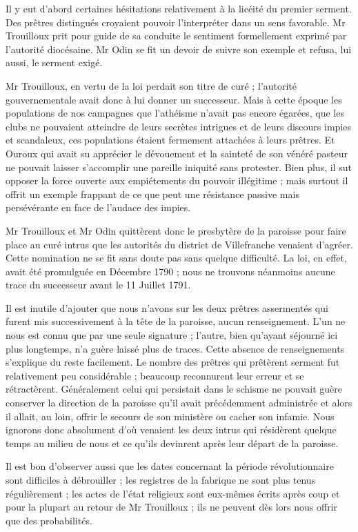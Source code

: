 Il y eut d'abord certaines hésitations relativement à la licéité du premier serment. Des prêtres distingués croyaient pouvoir l'interpréter dans un sens favorable. Mr Trouilloux prit pour guide de sa conduite le sentiment formellement exprimé par l'autorité diocésaine. Mr Odin se fit un devoir de suivre son exemple et refusa, lui aussi, le serment exigé.

Mr Trouilloux, en vertu de la loi perdait son titre de curé ; l'autorité gouvernementale avait donc à lui donner un successeur. Mais à cette époque les populations de nos campagnes que l'athéisme n'avait pas encore égarées, que les clubs ne pouvaient atteindre de leurs secrètes intrigues et de leurs discours impies et scandaleux, ces populations étaient fermement attachées à leurs prêtres. Et Ouroux qui avait su apprécier le dévouement et la sainteté de son vénéré pasteur ne pouvait laisser s'accomplir une pareille iniquité sans protester. Bien plus, il sut opposer la force ouverte aux empiétements du pouvoir illégitime ; mais surtout il offrit un exemple frappant de ce que peut une résistance passive mais persévérante en face de l'audace des impies.

Mr Trouilloux et Mr Odin quittèrent donc le presbytère de la paroisse pour faire place au curé intrus que les autorités du district de Villefranche venaient d'agréer. Cette nomination ne se fit sans doute pas sans quelque difficulté. La loi, en effet, avait été promulguée en Décembre 1790 ; nous ne trouvons néanmoins aucune trace du successeur avant le 11 Juillet 1791.

Il est inutile d'ajouter que nous n'avons sur les deux prêtres assermentés qui furent mis successivement à la tête de la paroisse, aucun renseignement. L'un ne nous est connu que par une seule signature ; l'autre, bien qu'ayant séjourné ici plus longtemps, n'a guère laissé plus de traces. Cette absence de renseignements s'explique
du reste facilement. Le nombre des prêtres qui prêtèrent serment fut relativement peu considérable ; beaucoup reconnurent leur erreur et se rétractèrent. Généralement celui qui persistait dans le schisme ne pouvait guère conserver la direction de la paroisse qu'il avait précédemment administrée et alors il allait, au loin, offrir le secours de son ministère ou cacher son infamie. Nous ignorons donc absolument d'où venaient les deux intrus qui résidèrent quelque temps au milieu de nous et ce qu'ils devinrent après leur départ de la paroisse.

Il est bon d'observer aussi que les dates concernant la période révolutionnaire sont difficiles à débrouiller ; les registres de la fabrique ne sont plus tenus régulièrement ; les actes de l'état religieux sont eux-mêmes écrits après coup et pour la plupart au retour de Mr Trouilloux ; ils ne peuvent dès lors nous offrir que des probabilités.

